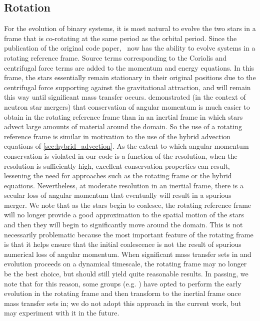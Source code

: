 \documentclass[12pt]{article}
\begin{document}
\subsection{Rotation}
\label{sec:rotation}

For the evolution of binary systems, it is most natural to evolve the
two stars in a frame that is co-rotating at the same period as the
orbital period. Since the publication of the original code paper, \castro\ 
now has the ability to evolve systems in a rotating reference frame. 
Source terms corresponding to the Coriolis and centrifugal force terms
are added to the momentum and energy equations. In this frame, the stars
essentially remain stationary in their original positions due to the
centrifugal force supporting against the gravitational attraction, and
will remain this way until significant mass transfer occurs. \cite{swc:2000}
demonstrated (in the context of neutron star mergers) that conservation of
angular momentum is much easier to obtain in the rotating reference frame
than in an inertial frame in which stars advect large amounts of material
around the domain. So the use of a rotating reference frame is similar in
motivation to the use of the hybrid advection equations of \autoref{sec:hybrid_advection}.
As the extent to which angular momentum conservation is violated in our code
is a function of the resolution, when the resolution is sufficiently high, 
excellent conservation properties can result, lessening the need for
approaches such as the rotating frame or the hybrid equations. Nevertheless,
at moderate resolution in an inertial frame, there is a secular loss of angular 
momentum that eventually will result in a spurious merger.
We note that as the stars begin to coalesce, the rotating reference frame
will no longer provide a good approximation to the spatial motion of
the stars and then they will begin to significantly move around the
domain. This is not necessarily problematic because the most important
feature of the rotating frame is that it helps ensure that the initial
coalescence is not the result of spurious numerical loss of angular
momentum. When significant mass transfer sets in and evolution
proceeds on a dynamical timescale, the rotating frame may no longer be the
best choice, but should still yield quite reasonable results. In passing,
we note that for this reason, some groups (e.g. \citet{pakmor:2012:gadget})
have opted to perform the early evolution in the rotating frame and then
transform to the inertial frame once mass transfer sets in; we do not
adopt this approach in the current work, but may experiment with it in
the future.
\end{document}
